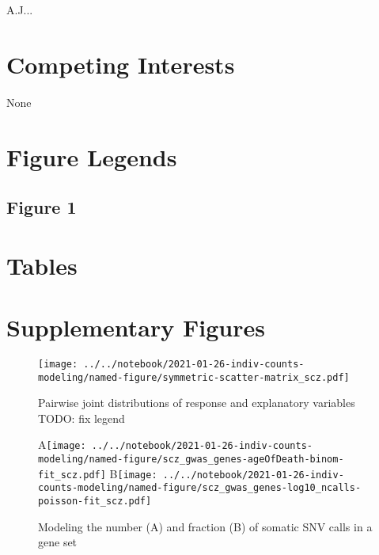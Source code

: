 \documentclass[letterpaper]{article}
\begin{document}
A.J...

\section*{Competing Interests}

None

\section*{Figure Legends}

\subsection*{Figure 1}

\section*{Tables}

\section*{Supplementary Figures}

\setcounter{figure}{0}
\makeatletter 
\renewcommand{\figurename}{Supplementary Figure} %
\makeatother

\begin{figure}[p]
\begin{center}
\texttt{[image: ../../notebook/2021-01-26-indiv-counts-modeling/named-figure/symmetric-scatter-matrix\_scz.pdf]}
\end{center}
\caption{
Pairwise joint distributions of response and explanatory variables TODO: fix legend
}
\label{fig:scattermatrix}
\end{figure}

\begin{figure}[p]
\begin{center}
A\texttt{[image: ../../notebook/2021-01-26-indiv-counts-modeling/named-figure/scz\_gwas\_genes-ageOfDeath-binom-fit\_scz.pdf]}
B\texttt{[image: ../../notebook/2021-01-26-indiv-counts-modeling/named-figure/scz\_gwas\_genes-log10\_ncalls-poisson-fit\_scz.pdf]}
\end{center}
\caption{
Modeling the number (A) and fraction (B) of somatic SNV calls in a gene set
}
\label{fig:fitted-lines}
\end{figure}
\end{document}

